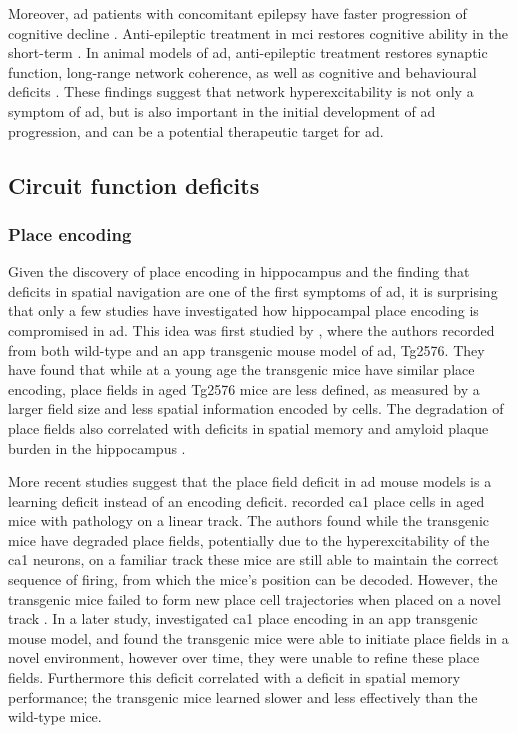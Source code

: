 Moreover, \gls{ad} patients with concomitant epilepsy have faster progression of cognitive decline \citep{vossel13, bakker15}. Anti-epileptic treatment in \gls{mci} restores cognitive ability in the short-term \citep{bakker15}. In animal models of \gls{ad}, anti-epileptic treatment restores synaptic function, long-range network coherence, as well as cognitive and behavioural deficits \citep{sanchez12, busche15}. These findings suggest that network hyperexcitability is not only a symptom of \gls{ad}, but is also important in the initial development of \gls{ad} progression, and can be a potential therapeutic target for \gls{ad}.

\subsection{Circuit function deficits}
\begin{comment}
\subsubsection{synchrony}
\citep{goutagny13}
\end{comment}
\subsubsection{Place encoding}
Given the discovery of place encoding in hippocampus and the finding that deficits in spatial navigation are one of the first symptoms of \gls{ad}, it is surprising that only a few studies have investigated how hippocampal place encoding is compromised in \gls{ad}. This idea was first studied by \citet{cacucci08}, where the authors recorded from both wild-type and an \gls{app} transgenic mouse model of \gls{ad}, Tg2576. They have found that while at a young age the transgenic mice have similar place encoding, place fields in aged Tg2576 mice are less defined, as measured by a larger field size and less spatial information encoded by cells. The degradation of place fields also correlated with deficits in spatial memory and amyloid plaque burden in the hippocampus \citep{cacucci08}.

More recent studies suggest that the place field deficit in \gls{ad} mouse models is a learning deficit instead of an encoding deficit. \citet{cheng13} recorded \gls{ca1} place cells in aged mice with \atau{} pathology on a linear track. The authors found while the transgenic mice have degraded place fields, potentially due to the hyperexcitability of the \gls{ca1} neurons, on a familiar track these mice are still able to maintain the correct sequence of firing, from which the mice's position can be decoded. However, the transgenic mice failed to form new place cell trajectories when placed on a novel track \citep{cheng13}. In a later study, \citet{zhao14} investigated \gls{ca1} place encoding in an \gls{app} transgenic mouse model, and found the transgenic mice were able to initiate place fields in a novel environment, however over time, they were unable to refine these place fields. Furthermore this deficit correlated with a deficit in spatial memory performance; the transgenic mice learned slower and less effectively than the wild-type mice.

